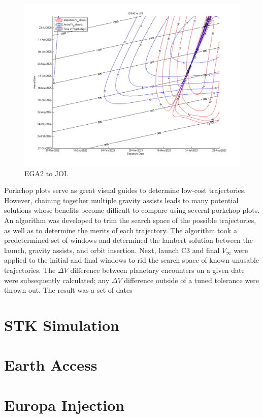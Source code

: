 \documentclass[]{aiaa-tc}%
\begin{document}
	\begin{figure}[H]
		\centering
			\includegraphics[width = 18cm]{../PCP/VEEJ/3_EGA2_JOI.png}
		\caption{EGA2 to JOI. }
		\label{fig:PCP_EGA2_JOI}
	\end{figure}	

	Porkchop plots serve as great visual guides to determine low-cost trajectories. However, chaining together multiple gravity assists leads to many potential solutions whose benefits become difficult to compare using several porkchop plots. An algorithm was developed to trim the search space of the possible trajectories, as well as to determine the merits of each trajectory. The algorithm took a predetermined set of windows and determined the lambert solution between the launch, gravity assists, and orbit insertion. Next, launch C3 and final $V_\infty$ were applied to the initial and final windows to rid the search space of known unusable trajectories. The ${\Delta}V$ difference between planetary encounters on a given date were subsequently calculated; any ${\Delta}V$ difference outside of a tuned tolerance were thrown out. The result was a set of dates
	\section{STK Simulation}

	\section{Earth Access}

	\section{Europa Injection}
\end{document}
